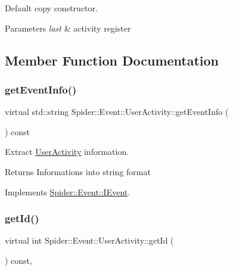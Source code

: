 Default copy constructor. 


\begin{DoxyParams}{Parameters}
{\em last} & activity register \\
\hline
\end{DoxyParams}


\subsection{Member Function Documentation}
\mbox{\label{class_spider_1_1_event_1_1_user_activity_a72d2436a1d9b339cc1cb1950f374562f}} 
\subsubsection{\texorpdfstring{get\+Event\+Info()}{getEventInfo()}}
{\footnotesize\ttfamily virtual std\+::string Spider\+::\+Event\+::\+User\+Activity\+::get\+Event\+Info (\begin{DoxyParamCaption}{ }\end{DoxyParamCaption}) const\hspace{0.3cm}{\ttfamily [virtual]}}



Extract \hyperlink{class_spider_1_1_event_1_1_user_activity}{User\+Activity} information. 

\begin{DoxyReturn}{Returns}
Informations into string format 
\end{DoxyReturn}


Implements \hyperlink{class_spider_1_1_event_1_1_i_event_ac8471df73080237faea55de539d968a0}{Spider\+::\+Event\+::\+I\+Event}.

\mbox{\label{class_spider_1_1_event_1_1_user_activity_aabcbc7060a3f015b71f0b26b475ccf75}} 
\subsubsection{\texorpdfstring{get\+Id()}{getId()}}
{\footnotesize\ttfamily virtual int Spider\+::\+Event\+::\+User\+Activity\+::get\+Id (\begin{DoxyParamCaption}{ }\end{DoxyParamCaption}) const\hspace{0.3cm}{\ttfamily [inline]}, {\ttfamily [virtual]}}



